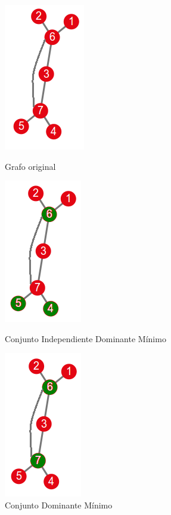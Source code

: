 \documentclass[a4paper]{article}
\begin{document}
\begin{figure}[!htb]
\begin{center}
  \includegraphics[scale=0.8]{imagenes/cidm-vs-cdm.png}
\end{center}
  \caption{Grafo original}\label{fig:cidm-vs-cdm}
\endminipage\hfill
{}
\begin{center}
  \includegraphics[scale=0.8]{imagenes/vsCIDM.png}
\end{center}
  \caption{Conjunto Independiente Dominante Mínimo}\label{fig:vsCIDM}
\endminipage\hfill
{}
\begin{center}
  \includegraphics[scale=0.8]{imagenes/vsCDM.png}
\end{center}
  \caption{Conjunto Dominante Mínimo}\label{fig:vsCDM}
\endminipage
\end{figure}
\end{document}
